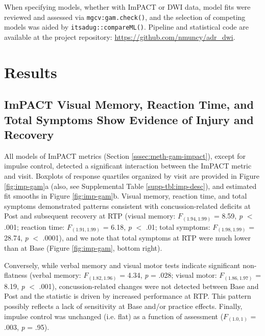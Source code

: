 \documentclass[12pt]{article}
\begin{document}
When specifying models, whether with ImPACT or DWI data, model fits were reviewed and assessed via \lstinline{mgcv:gam.check()}, and the selection of competing models was aided by \lstinline{itsadug::compareML()}. Pipeline and statistical code are available at the project repository: \url{https://github.com/nmuncy/adr_dwi}.


\section{Results}
\label{sec:res}

\subsection{ImPACT Visual Memory, Reaction Time, and Total Symptoms Show Evidence of Injury and Recovery}
\label{ssec:res-imp}
All models of ImPACT metrics (Section \ref{sssec:meth-gam-impact}), except for impulse control, detected a significant interaction between the ImPACT metric and visit. Boxplots of response quartiles organized by visit are provided in Figure \ref{fig:imp-gam}a (also, see Supplemental Table \ref{supp-tbl:imp-desc}), and estimated fit smooths in Figure \ref{fig:imp-gam}b. Visual memory, reaction time, and total symptoms demonstrated patterns consistent with concussion-related deficits at Post and subsequent recovery at RTP (visual memory: $F_{(1.94, 1.99)}$ = 8.59, \textit{p} $<$ .001; reaction time: $F_{(1.91, 1.99)}$ = 6.18, \textit{p} $<$ .01; total symptoms: $F_{(1.98, 1.99)}$ = 28.74, \textit{p} $<$ .0001), and we note that total symptoms at RTP were much lower than at Base (Figure \ref{fig:imp-gam}, bottom right).

Conversely, while verbal memory and visual motor tests indicate significant non-flatness (verbal memory: $F_{(1.82, 1.96)}$ = 4.34, \textit{p} = .028; visual motor: $F_{(1.86, 1.97)}$ = 8.19, \textit{p} $<$ .001), concussion-related changes were not detected between Base and Post and the statistic is driven by increased performance at RTP. This pattern possibly reflects a lack of sensitivity at Base and/or practice effects. Finally, impulse control was unchanged (i.e. flat) as a function of assessment ($F_{(1.0, 1)}$ = .003, \textit{p} = .95).
\end{document}
